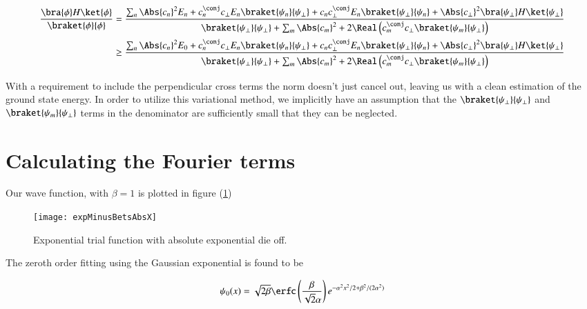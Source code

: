 \begin{equation}\label{eqn:variationHarmonicOscillator:290}
\begin{aligned}
\frac{\bra{\phi} H \ket{\phi}}{
\braket{\phi}{\phi}
}
&=
\frac{
\sum_n \Abs{c_n}^2 E_n
+ c_n^\conj c_\perp E_n
\braket{\psi_n}{\psi_\perp}
+ c_n c_\perp^\conj E_n \braket{\psi_\perp}{\psi_n}
+ \Abs{c_\perp}^2
\bra{\psi_\perp} H \ket{\psi_\perp} 
}
{
\braket{\psi_\perp}{\psi_\perp} +
\sum_m \Abs{c_m}^2 + 2 \Real \left(c_m^\conj c_\perp \braket{\psi_m}{\psi_\perp} \right)
} \\
&\ge 
\frac{
\sum_n \Abs{c_n}^2 E_0
+ c_n^\conj c_\perp E_n
\braket{\psi_n}{\psi_\perp}
+ c_n c_\perp^\conj E_n \braket{\psi_\perp}{\psi_n}
+ \Abs{c_\perp}^2
\bra{\psi_\perp} H \ket{\psi_\perp} 
}
{
\braket{\psi_\perp}{\psi_\perp} +
\sum_m \Abs{c_m}^2 + 2 \Real \left(c_m^\conj c_\perp \braket{\psi_m}{\psi_\perp} \right)
}
\end{aligned}
\end{equation}

With a requirement to include the perpendicular cross terms the norm doesn't just cancel out, leaving us with a clean estimation of the ground state energy.  In order to utilize this variational method, we implicitly have an assumption that the $\braket{\psi_\perp}{\psi_\perp}$ and $\braket{\psi_m}{\psi_\perp}$ terms in the denominator are sufficiently small that they can be neglected.

\section{Calculating the Fourier terms}

Our wave function, with $\beta=1$ is plotted in figure (\ref{fig:expMinusBetsAbsX})

\begin{figure}[htp]
\centering
\texttt{[image: expMinusBetsAbsX]}
\caption{Exponential trial function with absolute exponential die off.}\label{fig:expMinusBetsAbsX}
\end{figure}

The zeroth order fitting using the Gaussian exponential is found to be

\begin{equation}\label{eqn:variationHarmonicOscillator:310}
\psi_0(x) = \sqrt{2 \beta} 
\erfc\left(\frac{\beta }{\sqrt{2} \alpha }\right)
e^{- \alpha^2 x^2/2 +\beta^2/(2 \alpha^2)} 
\end{equation}

